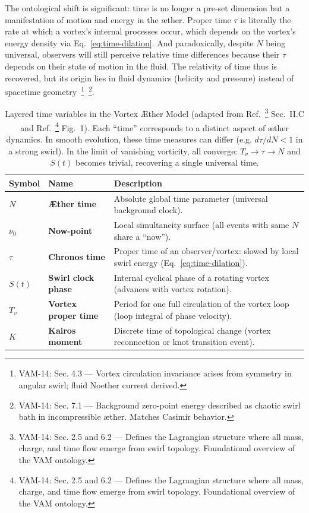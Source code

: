 \documentclass[a4paper,12pt]{article}
\begin{document}
    The ontological shift is significant: time is no longer a pre-set dimension but a manifestation of motion and energy in the æther. Proper time $\tau$ is literally the rate at which a vortex’s internal processes occur, which depends on the vortex’s energy density via Eq.~\eqref{eq:time-dilation}. And paradoxically, despite $N$ being universal, observers will still perceive relative time differences because their $\tau$ depends on their state of motion in the fluid. The relativity of time thus is recovered, but its origin lies in fluid dynamics (helicity and pressure) instead of spacetime geometry~\footnote{VAM-14: Sec. 4.3 — Vortex circulation invariance arises from symmetry in angular swirl; fluid Noether current derived.}~\footnote{VAM-14: Sec. 7.1 — Background zero-point energy described as chaotic swirl bath in incompressible æther. Matches Casimir behavior.}.

    \begin{table}[t]\centering
    \begin{tabular}{llp{8cm}}
        \hline
        Symbol & Name & Description \\
        \hline
        $N$ & \textbf{Æther time} & Absolute global time parameter (universal background clock). \\[6pt]
        $\nu_0$ & \textbf{Now-point} & Local simultaneity surface (all events with same $N$ share a ``now''). \\[6pt]
        $\tau$ & \textbf{Chronos time} & Proper time of an observer/vortex: slowed by local swirl energy (Eq.~\ref{eq:time-dilation}). \\[6pt]
        $S(t)$ & \textbf{Swirl clock phase} & Internal cyclical phase of a rotating vortex (advances with vortex rotation). \\[6pt]
        $T_v$ & \textbf{Vortex proper time} & Period for one full circulation of the vortex loop (loop integral of phase velocity). \\[6pt]
        $K$ & \textbf{Kairos moment} & Discrete time of topological change (vortex reconnection or knot transition event). \\
        \hline
    \end{tabular}
    \caption{Layered time variables in the Vortex Æther Model (adapted from Ref.~\footnote{VAM-14: Sec. 2.5 and 6.2 — Defines the Lagrangian structure where all mass, charge, and time flow emerge from swirl topology. Foundational overview of the VAM ontology.} Sec.~II.C and Ref.~\footnote{VAM-14: Sec. 2.5 and 6.2 — Defines the Lagrangian structure where all mass, charge, and time flow emerge from swirl topology. Foundational overview of the VAM ontology.} Fig.~1). Each ``time'' corresponds to a distinct aspect of æther dynamics. In smooth evolution, these time measures can differ (e.g. $d\tau/dN < 1$ in a strong swirl). In the limit of vanishing vorticity, all converge: $T_v \to \tau \to N$ and $S(t)$ becomes trivial, recovering a single universal time.}
    \label{tab:times}
    \end{table}
\end{document}
